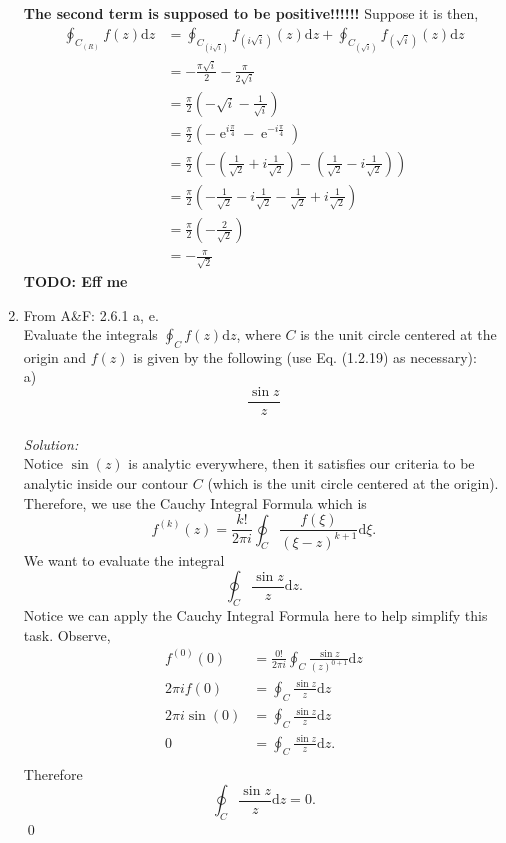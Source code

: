 \documentclass[10pt]{amsart}
\newcommand{\D}{\mathrm{d}}
\DeclareMathOperator{\E}{e}
\theoremstyle{nonumberplain}
\begin{document}
\begin{enumerate}[label={\bf {\arabic*}:}]
\textbf{The second term is supposed to be positive!!!!!!} Suppose it is then,
\begin{align*}
\oint_{C_{(R)}} f(z) \D z
	&= \oint_{C_{(i\sqrt{i})}} f_{(i\sqrt{i})}(z) \D z + \oint_{C_{(\sqrt{i})}} f_{(\sqrt{i})}(z) \D z \\
	&= - \frac{\pi \sqrt{i}}{2} - \frac{\pi}{2\sqrt{i}} \\
	&= \frac{\pi}{2}\left(- \sqrt{i} - \frac{1}{\sqrt{i}}\right) \\
	&= \frac{\pi}{2}\left(- \E^{i\frac{\pi}{4}} - \E^{-i\frac{\pi}{4}}\right) \\
	&= \frac{\pi}{2}\left(-\left(\frac 1 {\sqrt{2}} + i\frac 1 {\sqrt{2}}\right) - \left( \frac 1 {\sqrt{2}} - i\frac 1 {\sqrt{2}}\right)\right) \\
	&= \frac{\pi}{2}\left(-\frac 1 {\sqrt{2}} - i\frac 1 {\sqrt{2}} - \frac 1 {\sqrt{2}} + i\frac 1 {\sqrt{2}}\right) \\
	&= \frac{\pi}{2}\left(-\frac 2 {\sqrt{2}}\right) \\
	&= -\frac{\pi}{\sqrt{2}}
\end{align*}
\textbf{TODO: Eff me} \\

\item From A\&F: 2.6.1 a, e.\\
Evaluate the integrals $\oint_C f(z) \D z$, where $C$ is the unit circle centered at the origin and $f(z)$ is given by the following (use Eq. (1.2.19) as necessary): \\
a)
$$
\frac{\sin z}{z}
$$
\\
\textit{Solution:}\\
Notice $\sin(z)$ is analytic everywhere, then it satisfies our criteria to be analytic inside our contour $C$ (which is the unit circle centered at the origin).
Therefore, we use the Cauchy Integral Formula which is
$$
f^{(k)}(z) = \frac{k!}{2\pi i} \oint_C \frac{f(\xi)}{\left(\xi - z\right)^{k + 1}} \D \xi.
$$
We want to evaluate the integral 
$$
\oint_C \frac{\sin z}{z} \D z.
$$
Notice we can apply the Cauchy Integral Formula here to help simplify this task.
Observe,
\begin{align*}
f^{(0)}(0) &= \frac{0!}{2\pi i} \oint_C \frac{\sin z}{(z)^{0 + 1}} \D z \\
2\pi i f(0) &= \oint_C \frac{\sin z}{z} \D z \\
2\pi i \sin(0) &= \oint_C \frac{\sin z}{z} \D z \\
0 &= \oint_C \frac{\sin z}{z} \D z. \\
\end{align*}
Therefore 
$$
\oint_C \frac{\sin z}{z} \D z = 0.
$$
\qed
\\


\end{enumerate}
\end{document}
